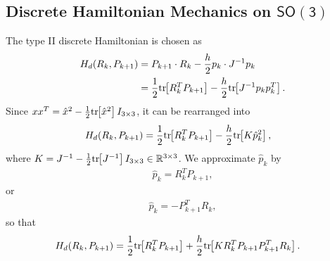 \documentclass[letterpaper, 10pt, conference]{ieeeconf}
\newcommand{\bracket}[1]{\ensuremath{\left[ #1 \right]}}
\newcommand{\tr}[1]{\mbox{tr}\ensuremath{\negthickspace\bracket{#1}}}
\newcommand{\SO}{\ensuremath{\mathsf{SO(3)}}}
\renewcommand{\Re}{\ensuremath{\mathbb{R}}}
\begin{document}
\subsection{Discrete Hamiltonian Mechanics on $\SO$}
The type II discrete Hamiltonian is chosen as
\begin{align*}
    H_d (R_k, P_{k+1}) 
    & = P_{k+1} \cdot R_k   - \frac{h}{2} p_k \cdot J^{-1} p_k\\
    & = \frac{1}{2}\tr{R_k^T P_{k+1}}   - \frac{h}{2} \tr{ J^{-1} p_kp_k^T}.
\end{align*}
Since $xx^T = \hat x^2 -\frac{1}{2}\tr{\hat x^2}I_{3\times 3}$, it can be rearranged into
\begin{align*}
    H_d (R_k, P_{k+1}) 
     & = \frac{1}{2}\tr{R_k^T P_{k+1}}   - \frac{h}{2} \tr{ K \hat p_k^2},
\end{align*}
where $K = J^{-1} - \frac{1}{2}\tr{J^{-1}} I_{3\times 3} \in\Re^{3\times 3} $.
We approximate $\hat p_k$ by 
\begin{align*}
    \hat p_k = R_k^T P_{k+1},
\end{align*}
or
\begin{align*}
    \hat p_k = - P_{k+1}^T R_k,
\end{align*}
so that
\begin{align*}
    H_d (R_k, P_{k+1}) 
    & = \frac{1}{2}\tr{R_k^T P_{k+1}}   + \frac{h}{2} \tr{ K R_k^T P_{k+1} P_{k+1}^T R_k }.
\end{align*}
\end{document}
